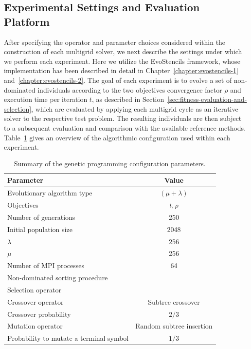\subsection{Experimental Settings and Evaluation Platform}
\label{sec:optimization-settings}
After specifying the operator and parameter choices considered within the construction of each multigrid solver, we next describe the settings under which we perform each experiment.
Here we utilize the EvoStencils framework, whose implementation has been described in detail in Chapter~\ref{chapter:evostencils-1} and~\ref{chapter:evostencils-2}.
The goal of each experiment is to evolve a set of non-dominated individuals according to the two objectives convergence factor $\rho$ and execution time per iteration $t$, as described in Section~\ref{sec:fitness-evaluation-and-selection}, which are evaluated by applying each multigrid cycle as an iterative solver to the respective test problem.
The resulting individuals are then subject to a subsequent evaluation and comparison with the available reference methods. 
Table~\ref{table:gp-parameters} gives an overview of the algorithmic configuration used within each experiment.
\begin{table}
	\centering
	\caption{Summary of the genetic programming configuration parameters.}
	\label{table:gp-parameters}
	\begin{tabular}{l c}
		\toprule
		Parameter & Value \\
		\midrule 
		Evolutionary algorithm type & $(\mu + \lambda)$ \\
		\midrule
		Objectives & $t, \rho$ \\
		\midrule
		Number of generations & 250 \\
		\midrule
		Initial population size & 2048 \\
		\midrule
		$\lambda$ & 256 \\
		\midrule
		$\mu$ & 256 \\
		\midrule
		Number of MPI processes & 64 \\
		\midrule
		Non-dominated sorting procedure & \cite{deb2002fast} \\ 
		\midrule
		Selection operator & \cite{deb2002fast} \\ 
		\midrule
		Crossover operator & Subtree crossover \\
		\midrule
		Crossover probability & $2/3$ \\
		\midrule
		Mutation operator & Random subtree insertion \\
		\midrule 
		Probability to mutate a terminal symbol & $1/3$ \\
		\bottomrule
	\end{tabular}
\end{table}

